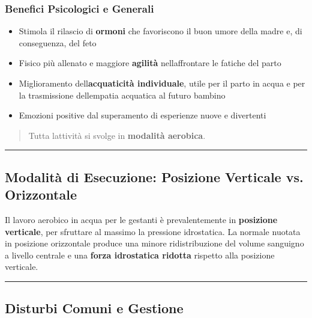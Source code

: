 \documentclass[a4paper,11pt]{article}
\providecommand{\tightlist}{%
  \setlength{\itemsep}{0pt}\setlength{\parskip}{0pt}}
\begin{document}
\subsubsection{Benefici Psicologici e
      Generali}\label{benefici-psicologici-e-generali}

\begin{itemize}
      \tightlist
      \item
            Stimola il rilascio di \textbf{ormoni} che favoriscono il buon umore
            della madre e, di conseguenza, del feto
      \item
            Fisico più allenato e maggiore \textbf{agilità}
            nell\textquotesingle affrontare le fatiche del parto
      \item
            Miglioramento dell\textquotesingle{}\textbf{acquaticità individuale},
            utile per il parto in acqua e per la trasmissione
            dell\textquotesingle empatia acquatica al futuro bambino
      \item
            Emozioni positive dal superamento di esperienze nuove e divertenti
\end{itemize}

\begin{quote}
      Tutta l\textquotesingle attività si svolge in \textbf{modalità
            aerobica}.
\end{quote}

\begin{center}\rule{0.5\linewidth}{0.5pt}\end{center}

\subsection{Modalità di Esecuzione: Posizione Verticale vs.
      Orizzontale}\label{modalituxe0-di-esecuzione-posizione-verticale-vs.-orizzontale}

Il lavoro aerobico in acqua per le gestanti è prevalentemente in
\textbf{posizione verticale}, per sfruttare al massimo la pressione
idrostatica. La normale nuotata in posizione orizzontale produce una
minore ridistribuzione del volume sanguigno a livello centrale e una
\textbf{forza idrostatica ridotta} rispetto alla posizione verticale.

\begin{center}\rule{0.5\linewidth}{0.5pt}\end{center}

\subsection{Disturbi Comuni e
      Gestione}\label{disturbi-comuni-e-gestione}
\end{document}

